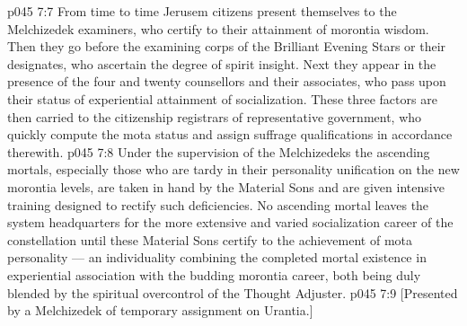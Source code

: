 \vs p045 7:7 From time to time Jerusem citizens present themselves to the Melchizedek examiners, who certify to their attainment of morontia wisdom. Then they go before the examining corps of the Brilliant Evening Stars or their designates, who ascertain the degree of spirit insight. Next they appear in the presence of the four and twenty counsellors and their associates, who pass upon their status of experiential attainment of socialization. These three factors are then carried to the citizenship registrars of representative government, who quickly compute the mota status and assign suffrage qualifications in accordance therewith.
\vs p045 7:8 \pc Under the supervision of the Melchizedeks the ascending mortals, especially those who are tardy in their personality unification on the new morontia levels, are taken in hand by the Material Sons and are given intensive training designed to rectify such deficiencies. No ascending mortal leaves the system headquarters for the more extensive and varied socialization career of the constellation until these Material Sons certify to the achievement of mota personality --- an individuality combining the completed mortal existence in experiential association with the budding morontia career, both being duly blended by the spiritual overcontrol of the Thought Adjuster.
\vsetoff
\vs p045 7:9 [Presented by a Melchizedek of temporary assignment on Urantia.]
\quizlink
